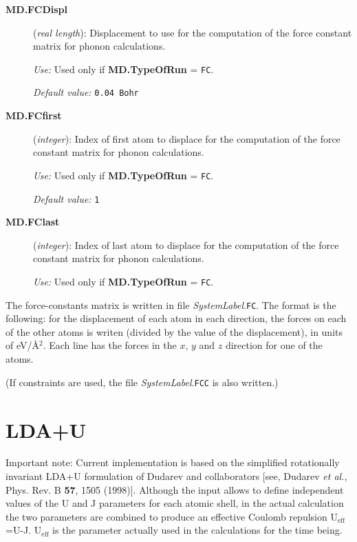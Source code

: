 \begin{description}
\item[\textbf{MD.FCDispl}] (\textit{real length}):
Displacement to use for the computation of the force constant
matrix for phonon calculations.

\textit{Use:} Used only if \textbf{MD.TypeOfRun} = \texttt{FC}.

\textit{Default value:}  \texttt{0.04 Bohr}

\item[\textbf{MD.FCfirst}] (\textit{integer}):
Index of first atom to displace for the computation of the force constant
matrix for phonon calculations.

\textit{Use:} Used only if \textbf{MD.TypeOfRun} = \texttt{FC}.

\textit{Default value:}  \texttt{1}

\item[\textbf{MD.FClast}] (\textit{integer}):
Index of last atom to displace for the computation of the force constant
matrix for phonon calculations.

\textit{Use:} Used only if \textbf{MD.TypeOfRun} = \texttt{FC}.
\end{description}

The force-constants matrix is written in file \textit{SystemLabel}.\texttt{FC}.
The format is the following: for the displacement of
each atom in each direction, the forces on each of the other
atoms is writen (divided by the value of the displacement),
in units of eV/\AA$^2$. Each line has the forces in the $x$, $y$
and $z$ direction for one of the atoms.

(If constraints are used, the file \textit{SystemLabel}.\texttt{FCC} is
also written.)

\section{LDA+U}
Important note: Current implementation is based on the
simplified rotationally invariant LDA+U formulation
of Dudarev and collaborators
[see, Dudarev \textit{et al.}, Phys. Rev. B \textbf{57}, 1505 (1998)].
Although the input allows to define
independent values of the U and J parameters for
each atomic shell,
in the actual calculation
the two  parameters are combined to produce
an effective Coulomb repulsion U$_{\mathrm{eff}}$=U-J. U$_{\mathrm{eff}}$
is the parameter actually used in the calculations
for the time being.

